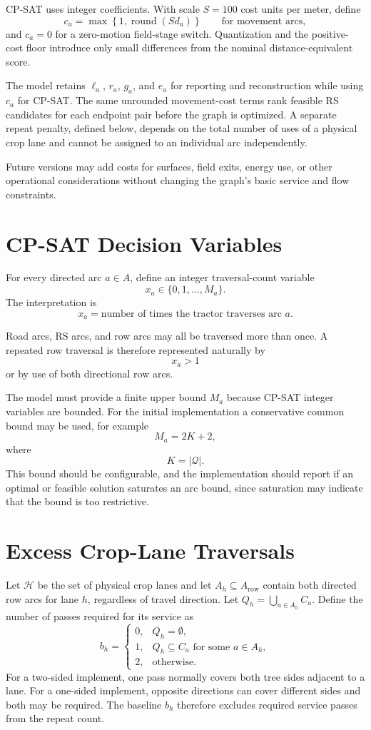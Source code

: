 \documentclass{article}
\begin{document}
CP-SAT uses integer coefficients. With scale $S=100$ cost units per meter, define
$$
c_a
=
\max\!\left\{1,\operatorname{round}(S d_a)\right\}
\qquad\text{for movement arcs},
$$
and $c_a=0$ for a zero-motion field-stage switch. Quantization and the positive-cost floor introduce only small differences from the nominal distance-equivalent score.

The model retains $\ell_a$, $r_a$, $g_a$, and $e_a$ for reporting and reconstruction while using $c_a$ for CP-SAT. The same unrounded movement-cost terms rank feasible RS candidates for each endpoint pair before the graph is optimized. A separate repeat penalty, defined below, depends on the total number of uses of a physical crop lane and cannot be assigned to an individual arc independently.

Future versions may add costs for surfaces, field exits, energy use, or other operational considerations without changing the graph's basic service and flow constraints.

\section{CP-SAT Decision Variables}

For every directed arc $a\in A$, define an integer traversal-count variable
$$
x_a
\in
\{0,1,\ldots,M_a\}.
$$
The interpretation is
$$
x_a
=
\text{number of times the tractor traverses arc }a.
$$

Road arcs, RS arcs, and row arcs may all be traversed more than once.
A repeated row traversal is therefore represented naturally by
$$
x_a>1
$$
or by use of both directional row arcs.

The model must provide a finite upper bound $M_a$ because CP-SAT integer variables are bounded.
For the initial implementation a conservative common bound may be used, for example
$$
M_a = 2K+2,
$$
where
$$
K=|\mathcal{Q}|.
$$
This bound should be configurable, and the implementation should report if an optimal or feasible solution saturates an arc bound, since saturation may indicate that the bound is too restrictive.

\section{Excess Crop-Lane Traversals}

Let $\mathcal{H}$ be the set of physical crop lanes and let $A_h\subseteq A_{\mathrm{row}}$ contain both directed row arcs for lane $h$, regardless of travel direction. Let $Q_h=\bigcup_{a\in A_h}C_a$. Define the number of passes required for its service as
\[
b_h=
\begin{cases}
0, & Q_h=\emptyset,\\
1, & Q_h\subseteq C_a\text{ for some }a\in A_h,\\
2, & \text{otherwise}.
\end{cases}
\]
For a two-sided implement, one pass normally covers both tree sides adjacent to a lane. For a one-sided implement, opposite directions can cover different sides and both may be required. The baseline $b_h$ therefore excludes required service passes from the repeat count.
\end{document}

